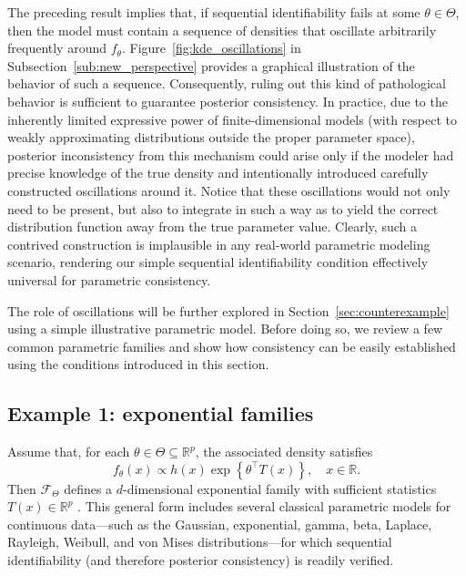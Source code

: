 \documentclass[11pt,twoside]{article}
\def\RR{\mathbb{R}}
\begin{document}
The preceding result implies that, if sequential identifiability fails at some \(\theta \in \Theta\), then the model must contain a sequence of densities that oscillate arbitrarily frequently around \(f_\theta\). Figure~\ref{fig:kde_oscillations} in Subsection~\ref{sub:new_perspective} provides a graphical illustration of the behavior of such a sequence. Consequently, ruling out this kind of pathological behavior is sufficient to guarantee posterior consistency. In practice, due to the inherently limited expressive power of finite-dimensional models (with respect to weakly approximating distributions outside the proper parameter space), posterior inconsistency from this mechanism could arise only if the modeler had precise knowledge of the true density and intentionally introduced carefully constructed oscillations around it. Notice that these oscillations would not only need to be present, but also to integrate in such a way as to yield the correct distribution function away from the true parameter value. Clearly, such a contrived construction is implausible in any real-world parametric modeling scenario, rendering our simple sequential identifiability condition effectively universal for parametric consistency.



The role of oscillations will be further explored in Section~\ref{sec:counterexample} using a simple illustrative parametric model. Before doing so, we review a few common parametric families and show how consistency can be easily established using the conditions introduced in this section.




\subsection{Example 1: exponential families}

Assume that, for each $\theta \in \Theta\subseteq \RR^p$, the associated density satisfies
%
\begin{equation*}
    f_\theta(x) \propto h(x) \exp\left\{\theta^\top T(x)\right\}, \quad x\in\RR.
\end{equation*}
%
Then $\mathcal{F}_\Theta$ defines a $d$-dimensional exponential family with sufficient statistics $T(x) \in \mathbb{R}^p$ \citep{efron2022}. This general form includes several classical parametric models for continuous data—such as the Gaussian, exponential, gamma, beta, Laplace, Rayleigh, Weibull, and von Mises distributions—for which sequential identifiability (and therefore posterior consistency) is readily verified.
\end{document}
